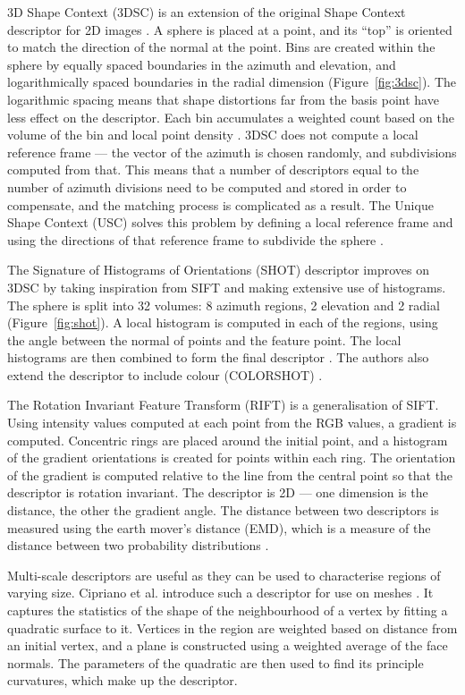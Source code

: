 \documentclass[11pt,a4paper]{kth-mag}
\begin{document}
3D Shape Context (3DSC) is an extension of the original Shape Context descriptor
for 2D images \cite{belongie2002shape}. A sphere is placed at a point, and its
``top'' is oriented to match the direction of the normal at the point. Bins are
created within the sphere by equally spaced boundaries in the azimuth and
elevation, and logarithmically spaced boundaries in the radial dimension (Figure~\ref{fig:3dsc}). The
logarithmic spacing means that shape distortions far from the basis point have
less effect on the descriptor. Each bin accumulates a weighted count based on
the volume of the bin and local point density \cite{frome2004recognizing}. 3DSC
does not compute a local reference frame --- the vector of the azimuth is chosen
randomly, and subdivisions computed from that. This means that a number of
descriptors equal to the number of azimuth divisions need to be computed and
stored in order to compensate, and the matching process is complicated as a
result. The Unique Shape Context (USC) solves this problem by defining a local
reference frame and using the directions of that reference frame to subdivide
the sphere \cite{tombari2010uniquesc}.

The Signature of Histograms of Orientations (SHOT) descriptor improves on 3DSC
by taking inspiration from SIFT and making extensive use of histograms. The
sphere is split into 32 volumes: 8 azimuth regions, 2 elevation and 2 radial
(Figure~\ref{fig:shot}). A local histogram is computed in each of the regions,
using the angle between the normal of points and the feature point. The local
histograms are then combined to form the final descriptor
\cite{tombari2010unique}. The authors also extend the descriptor to include
colour (COLORSHOT) \cite{tombari2011combined}.

The Rotation Invariant Feature Transform (RIFT) is a generalisation of SIFT. Using
intensity values computed at each point from the RGB values, a gradient is
computed. Concentric rings are placed around the initial point, and a histogram
of the gradient orientations is created for points within each ring. The
orientation of the gradient is computed relative to the line from the central
point so that the descriptor is rotation invariant. The descriptor is 2D --- one
dimension is the distance, the other the gradient angle. The distance between
two descriptors is measured using the earth mover's distance (EMD), which is a
measure of the distance between two probability distributions
\cite{lazebnik2005sparse}.

Multi-scale descriptors are useful as they can be used to characterise regions
of varying size. Cipriano et al. introduce such a descriptor for use on meshes
\cite{cipriano2009multi}. It captures the statistics of the shape of the
neighbourhood of a vertex by fitting a quadratic surface to it. Vertices in the
region are weighted based on distance from an initial vertex, and a plane is
constructed using a weighted average of the face normals. The parameters of the
quadratic are then used to find its principle curvatures, which make up the
descriptor.
\end{document}
